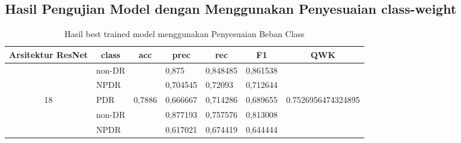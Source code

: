 \subsection{Hasil Pengujian Model dengan Menggunakan Penyesuaian class-weight}
    \begin{table}[hbtp]
        \begin{center}
        \caption{Hasil best trained model menggunakan Penyesuaian Beban Class}
        \label{tb:HasilTrainClassWeight}
        \begin{tabular}{|c|l|c|l|l|l|c|}
            \hline
            \rowcolor[HTML]{C0C0C0} 
            Arsitektur ResNet   & \multicolumn{1}{c|}{\cellcolor[HTML]{C0C0C0}class} & acc                      & \multicolumn{1}{c|}{\cellcolor[HTML]{C0C0C0}prec} & \multicolumn{1}{c|}{\cellcolor[HTML]{C0C0C0}rec} & \multicolumn{1}{c|}{\cellcolor[HTML]{C0C0C0}F1} & QWK                                  \\ \hline
                                  & non-DR                                             &                          & 0,875                                             & 0,848485                                         & 0,861538                                        &                                      \\ \cline{2-2} \cline{4-6}
                                  & NPDR                                               &                          & 0,704545                                          & 0,72093                                          & 0,712644                                        &                                      \\ \cline{2-2} \cline{4-6}
            \multirow{-3}{*}{18}  & PDR                                                & \multirow{-3}{*}{0,7886} & 0,666667                                          & 0,714286                                         & 0,689655                                        & \multirow{-3}{*}{0.7526956474324895} \\ \hline
                                  & non-DR                                             &                          & 0,877193                                          & 0,757576                                         & 0,813008                                        &                                      \\ \cline{2-2} \cline{4-6}
                                  & NPDR                                               &                          & 0,617021                                          & 0,674419                                         & 0,644444                                        &                                      \\ \cline{2-2} \cline{4-6}

\end{tabular}
\end{center}
\end{table}
